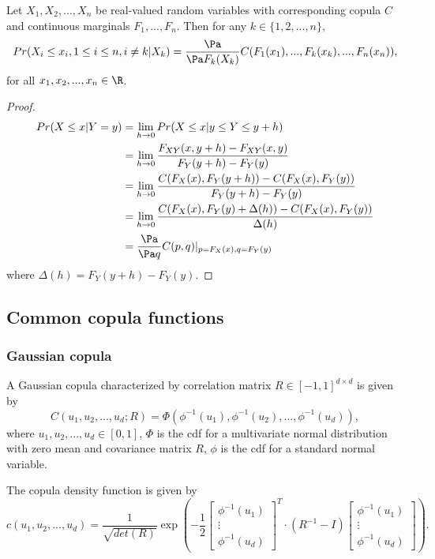 \begin{refsection}
\begin{lemma}\label{ch:statistical-models:th:partialDifferentialCopulaGivesConditionalDistributionOneConditionedOnMultiple}\cite[20]{schmitz2003copulas}
	Let $X_1,X_2,...,X_n$ be real-valued random variables with corresponding copula $C$ and continuous marginals $F_1,...,F_n$. Then for any $k\in\{1,2,...,n\},$
	$$Pr(X_i\leq x_i,1\leq i\leq n,i\neq k|X_k) = \frac{\Pa }{\Pa F_k(X_k)}C(F_1(x_1),...,F_k(x_k),...,F_n(x_n)),$$
	for all $x_1,x_2,...,x_n \in \R$.
\end{lemma}
\begin{proof}
	\begin{align*}
	Pr(X\leq x|Y = y) &= \lim_{h\to 0} Pr(X\leq x|y\leq Y \leq y+h) \\
	&= \lim_{h\to 0} \frac{F_{XY}(x,y+h) - F_{XY}(x,y)}{F_Y(y+h) - F_Y(y)} \\
	&= \lim_{h\to 0} \frac{C(F_X(x),F_Y(y+h)) - C(F_X(x),F_Y(y))}{F_Y(y+h) - F_Y(y)} \\
	&= \lim_{h\to 0} \frac{C(F_X(x),F_Y(y) + \Delta(h)) - C(F_X(x),F_Y(y))}{\Delta(h)} \\
	&= \frac{\Pa }{\Pa q}C(p,q)|_{p=F_X(x),q=F_Y(y)}
	\end{align*}
	where $\Delta(h) = F_Y(y+h) - F_Y(y).$
\end{proof}


\subsection{Common copula functions}\label{ch:statistical-models:sec:commonCopulaFunction}
\subsubsection{Gaussian copula}
\begin{definition}\label{ch:statistical-models:def:GaussianCopula}
A Gaussian copula characterized by correlation matrix $R\in [-1,1]^{d\times d}$ is given by
$$C(u_1,u_2,...,u_d; R) = \Phi(\phi^{-1}(u_1),\phi^{-1}(u_2),...,\phi^{-1}(u_d)),$$
where $u_1,u_2,...,u_d \in [0,1]$, $\Phi$ is the cdf for a multivariate normal distribution with zero mean and covariance matrix $R$, $\phi$ is the cdf for a standard normal variable. 

The copula density function is given by
$$c(u_1,u_2,...,u_d) = \frac{1}{\sqrt{det(R)}} \exp(-\frac{1}{2}
\begin{bmatrix}
\phi^{-1}(u_1) \\
\vdots\\
\phi^{-1}(u_d)
\end{bmatrix}^T \cdot (R^{-1} - I) \begin{bmatrix}
\phi^{-1}(u_1) \\
\vdots\\
\phi^{-1}(u_d)
\end{bmatrix}
).$$	
\end{definition}




\end{refsection}
